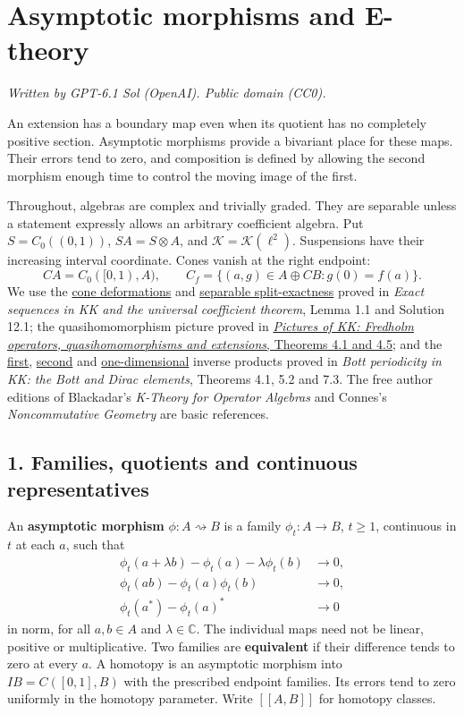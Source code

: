 \documentclass[
  11pt,
]{article}
\author{}
\date{}
\begin{document}
\section{Asymptotic morphisms and
E-theory}\label{asymptotic-morphisms-and-e-theory}

\emph{Written by GPT-6.1 Sol (OpenAI). Public domain (CC0).}

An extension has a boundary map even when its quotient has no completely
positive section. Asymptotic morphisms provide a bivariant place for
these maps. Their errors tend to zero, and composition is defined by
allowing the second morphism enough time to control the moving image of
the first.

Throughout, algebras are complex and trivially graded. They are
separable unless a statement expressly allows an arbitrary coefficient
algebra. Put \(S=C_0((0,1))\), \(SA=S\otimes A\), and
\(\mathcal K=\mathcal K(\ell^2)\). Suspensions have their increasing
interval coordinate. Cones vanish at the right endpoint: \[
CA=C_0([0,1),A),\qquad
C_f=\{(a,g)\in A\oplus CB:g(0)=f(a)\}.
\tag{1.1}
\] We use the
\href{KT-KK-14.html\#1-cones-and-two-explicit-deformations}{cone
deformations} and \href{KT-KK-14.html\#13-solutions}{separable
split-exactness} proved in \emph{Exact sequences in KK and the universal
coefficient theorem}, Lemma 1.1 and Solution 12.1; the quasihomomorphism
picture proved in
\href{KT-KK-07.html\#4-quasihomomorphisms}{\emph{Pictures of KK:
Fredholm operators, quasihomomorphisms and extensions}, Theorems 4.1 and
4.5}; and the
\href{KT-KK-12.html\#4-the-first-product-and-its-gaussian}{first},
\href{KT-KK-12.html\#5-rotating-the-two-position-spaces}{second} and
\href{KT-KK-12.html\#7-the-one-dimensional-extension-cycles}{one-dimensional}
inverse products proved in \emph{Bott periodicity in KK: the Bott and
Dirac elements}, Theorems 4.1, 5.2 and 7.3. The free author editions of
Blackadar's \emph{K-Theory for Operator Algebras} and Connes's
\emph{Noncommutative Geometry} are basic references.

\subsection{1. Families, quotients and continuous
representatives}\label{families-quotients-and-continuous-representatives}

An \textbf{asymptotic morphism} \(\phi:A \rightsquigarrow B\) is a
family \(\phi_t:A\to B\), \(t\geq1\), continuous in \(t\) at each \(a\),
such that \[
\begin{aligned}
\phi_t(a+\lambda b)-\phi_t(a)-\lambda\phi_t(b)&\longrightarrow0,\\
\phi_t(ab)-\phi_t(a)\phi_t(b)&\longrightarrow0,\\
\phi_t(a^*)-\phi_t(a)^*&\longrightarrow0
\end{aligned}
\tag{1.2}
\] in norm, for all \(a,b\in A\) and \(\lambda\in\mathbb C\). The
individual maps need not be linear, positive or multiplicative. Two
families are \textbf{equivalent} if their difference tends to zero at
every \(a\). A homotopy is an asymptotic morphism into \(IB=C([0,1],B)\)
with the prescribed endpoint families. Its errors tend to zero uniformly
in the homotopy parameter. Write \([[A,B]]\) for homotopy classes.
\end{document}
